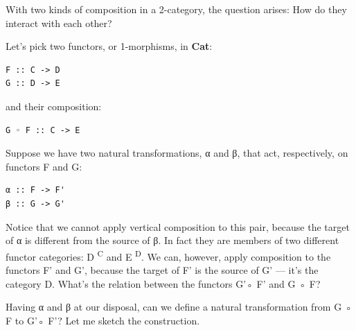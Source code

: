 \noindent
With two kinds of composition in a 2-category, the question arises: How
do they interact with each other?

Let's pick two functors, or 1-morphisms, in \textbf{Cat}:

\begin{Verbatim}[commandchars=\\\{\}]
F :: C -> D
G :: D -> E
\end{Verbatim}
and their composition:

\begin{Verbatim}[commandchars=\\\{\}]
G ◦ F :: C -> E
\end{Verbatim}
Suppose we have two natural transformations, α and β, that act,
respectively, on functors F and G:

\begin{Verbatim}[commandchars=\\\{\}]
α :: F -> F'
β :: G -> G'
\end{Verbatim}

\begin{figure}[H]
\centering
{}
\end{figure}

\noindent
Notice that we cannot apply vertical composition to this pair, because
the target of α is different from the source of β. In fact they are
members of two different functor categories: D \textsuperscript{C} and E
\textsuperscript{D}. We can, however, apply composition to the functors
F' and G', because the target of F' is the source of G' --- it's the
category D. What's the relation between the functors G'◦ F' and G ◦ F?

Having α and β at our disposal, can we define a natural transformation
from G ◦ F to G'◦ F'? Let me sketch the construction.

\begin{figure}[H]
\centering
{}
\end{figure}

